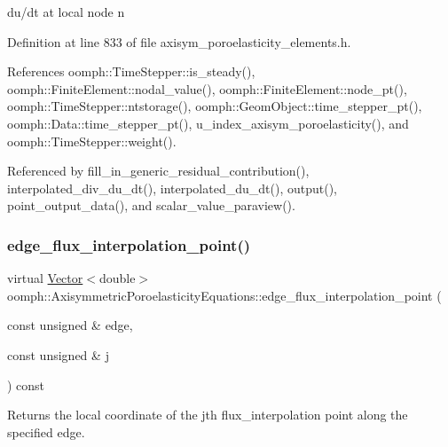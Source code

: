 du/dt at local node n 



Definition at line 833 of file axisym\+\_\+poroelasticity\+\_\+elements.\+h.



References oomph\+::\+Time\+Stepper\+::is\+\_\+steady(), oomph\+::\+Finite\+Element\+::nodal\+\_\+value(), oomph\+::\+Finite\+Element\+::node\+\_\+pt(), oomph\+::\+Time\+Stepper\+::ntstorage(), oomph\+::\+Geom\+Object\+::time\+\_\+stepper\+\_\+pt(), oomph\+::\+Data\+::time\+\_\+stepper\+\_\+pt(), u\+\_\+index\+\_\+axisym\+\_\+poroelasticity(), and oomph\+::\+Time\+Stepper\+::weight().



Referenced by fill\+\_\+in\+\_\+generic\+\_\+residual\+\_\+contribution(), interpolated\+\_\+div\+\_\+du\+\_\+dt(), interpolated\+\_\+du\+\_\+dt(), output(), point\+\_\+output\+\_\+data(), and scalar\+\_\+value\+\_\+paraview().

\mbox{\label{classoomph_1_1AxisymmetricPoroelasticityEquations_ad7406482ea1f004642ca1de325a3efd3}} 
\subsubsection{\texorpdfstring{edge\+\_\+flux\+\_\+interpolation\+\_\+point()}{edge\_flux\_interpolation\_point()}}
{\footnotesize\ttfamily virtual \hyperlink{classoomph_1_1Vector}{Vector}$<$double$>$ oomph\+::\+Axisymmetric\+Poroelasticity\+Equations\+::edge\+\_\+flux\+\_\+interpolation\+\_\+point (\begin{DoxyParamCaption}\item[{const unsigned \&}]{edge,  }\item[{const unsigned \&}]{j }\end{DoxyParamCaption}) const\hspace{0.3cm}{\ttfamily [pure virtual]}}



Returns the local coordinate of the jth flux\+\_\+interpolation point along the specified edge. 



